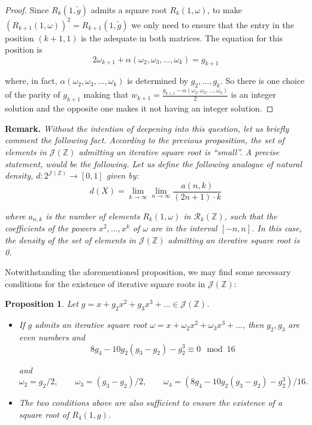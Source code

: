 \documentclass[preprint,12pt]{elsarticle}
\newtheorem{prop}[thm]{Proposition}
\begin{document}
\begin{proof} Since $R_k(1,\widetilde g)$ admits a square root $R_k(1,\omega)$, to make $(R_{k+1}(1,\omega))^2=R_{k+1}(1,\widetilde g)$ we only need to ensure that the entry in the position $(k+1,1)$ is the adequate in both matrices. The equation for this position is
$$2\omega_{k+1}+\alpha(\omega_2,\omega_3, \dots, \omega_k)=g_{k+1} $$

\noindent where, in fact, $\alpha(\omega_2,\omega_3, \dots, \omega_k)$ is determined by $g_2,\ldots, g_k$. So there is one choice of the parity of $g_{k+1}$ making that $w_{k+1} = \frac{g_{k+1} - \alpha(\omega_2,\omega_3, \dots, \omega_k)}{2}$ is an integer solution and the opposite one makes it not having an integer solution.
\end{proof}




\medskip
\noindent \textbf{Remark.} \emph{Without the intention of deepening into this question, let us briefly comment the following fact. According to the previous proposition, the set of elements in $\mathcal J(\mathbb Z)$ admitting an iterative square root is ``small''. A precise statement, would be the following. Let us define the following analogue of \emph{natural density}, $d:2^{\mathcal J(\mathbb Z)}\to[0,1]$ given by:}
$$d(X)=\lim_{k\to\infty}\lim_{n\to\infty}\frac{a(n,k)}{(2n+1)\cdot k} $$

\noindent \emph{where $a_{n,k}$ is the number of elements $R_k(1,\omega)$ in $\mathcal R_k(\mathbb Z)$, such that the coefficients of the powers $x^2,\ldots, x^k$ of  $\omega$ are in the interval $[-n,n]$. In this case, the density of the set of elements in $\mathcal J(\mathbb Z)$ admitting an iterative square root is 0.}




Notwithstanding the aforementioned proposition, we may find some necessary conditions for the existence of iterative square roots in $\mathcal J(\mathbb Z)$:

\begin{prop} Let $g=x+g_2x^2+g_3x^3+\ldots\in\mathcal J(\mathbb Z)$.

\begin{itemize}
\item  If $g$ admits an iterative square root $\omega=x+\omega_2x^2+\omega_3x^3+\ldots$, then $g_2,g_3$ are even numbers and
$$8g_4-10g_2(g_3-g_2)-g_2^3\equiv 0\mod 16$$

\noindent and
$$\omega_2=g_2/2,\qquad \omega_3=(g_3-g_2)/2,\qquad\omega_4=(8g_4-10g_2(g_3-g_2)-g_2^3)/16. $$


\item  The two conditions above are also sufficient to ensure the existence of a square root of $R_4(1,g)$.



\end{itemize}



\end{prop}
\end{document}

